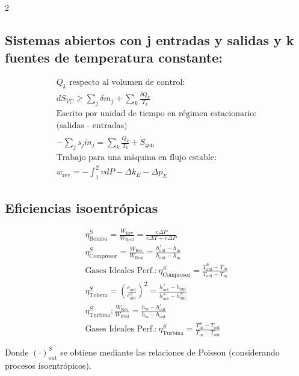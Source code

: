 \documentclass[9pt]{article}
\begin{document}
\begin{multicols}{2}
\subsection{Sistemas abiertos con j entradas y salidas y k fuentes de temperatura constante:}
\vspace{-2mm}

\begin{gather*}
  \text{$Q_k$ respecto al volumen de control:}\\
  dS_{VC}\geq \sum_j \delta m_j + \sum_k \frac{\delta Q_k}{T_k}\\
  \text{Escrito por unidad de tiempo en régimen estacionario:}\\
  \text{(salidas - entradas)}\\
  -\sum_j s_j \dot{m}_j = \sum_k\frac{\dot{Q}_k}{T_k}+\dot{S}_\text{gen}\\
  \text{Trabajo para una máquina en flujo estable:}\\
  w_\text{rev}=-\int_{1}^{2}vdP - \Delta k_E - \Delta p_E
\end{gather*}

\subsection{Eficiencias isoentrópicas}

\begin{gather*}
  \eta^S_{\text{Bomba}}=\frac{W_\text{Rev}}{W_\text{Real}}= \frac{v\Delta P }{c\Delta T+v\Delta P }\\
  \eta^S_\text{Compresor}=\frac{W_\text{Rev}}{W_\text{Real}}=\frac{h_\text{out}^s-h_\text{in}}{h_\text{out}-h_\text{in}}\\
  \text{Gases Ideales Perf.}: \eta^S_\text{Compresor}=\frac{T_\text{out}^S-T_\text{in}}{T_\text{out}-T_\text{in}}\\
  \eta^S_{\text{Tobera}}=\left(\frac{c_\text{out}}{c_\text{out}^S}\right)^2 = \frac{h_\text{out}^+-h_\text{out}}{h_\text{out}^+-h_\text{out}^S}\\
  \eta^S_\text{Turbina}: \frac{W_\text{Rev}}{W_\text{Real}}=\frac{h_\text{in}-h_\text{out}^s}{h_\text{in}-h_\text{out}}\\
  \text{Gases Ideales Perf.}: \eta^S_\text{Turbina}=\frac{T_\text{in}^S-T_\text{out}}{T_\text{in}-T_\text{out}}
\end{gather*}

Donde $(\cdot)_\text{out}^S$ se obtiene mediante las relaciones de Poisson (considerando procesos isoentrópicos).


\end{multicols}
\end{document}
